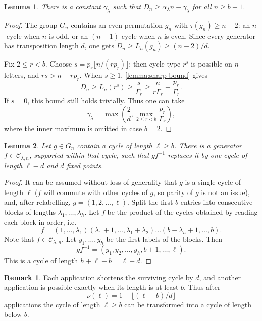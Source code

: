 \documentclass[DIV=12,10pt]{scrartcl}
\newtheorem{lemma}{Lemma}
\theoremstyle{definition}
\newtheorem{remark}{Remark}
\newcommand{\cc}{\mathcal{C}}
\begin{document}
\begin{lemma}
	\label{lemma:uniform-lower-certificate}
	There is a constant $\gamma_\lambda$ such that $D_n\geqslant \alpha_\lambda n -\gamma_\lambda$ for all $n\geqslant b+1$.
\end{lemma}
\begin{proof}
The group $G_n$ contains an even permutation $g_n$ with $\tau(g_n)\geqslant n-2$: an $n$-cycle when $n$ is odd, or an $(n-1)$-cycle when $n$ is even. Since every generator has transposition length $d$, one gets $D_n \geqslant L_n(g_n) \geqslant (n-2)/d$.

Fix $2\leqslant r<b$. Choose $s=p_r\lfloor n/(r p_r)\rfloor$; then cycle type $r^s$ is possible on $n$ letters, and $rs>n-r p_r$. When $s\geqslant 1$, \cref{lemma:sharp-bound} gives
\[
	D_n \geqslant L_n(r^s) \geqslant \frac{s}{\Gamma_r} \geqslant \frac{n}{r\Gamma_r} - \frac{p_r}{\Gamma_r}.
\]
If $s=0$, this bound still holds trivially. Thus one can take
\[
	\gamma_\lambda = \max\left( \frac{2}{d}, \max_{2\leqslant r < b} \frac{p_r}{\Gamma_r} \right),
\]
where the inner maximum is omitted in case $b=2$.
\end{proof}

\begin{lemma}
	\label{lemma:long-cycle-peeling}
	Let $g\in G_n$ contain a cycle of length $\ell \geqslant b$. There is a generator $f\in \cc_{\lambda,n}$, supported within that cycle, such that $gf^{-1}$ replaces it by one cycle of length $\ell-d$ and $d$ fixed points.
\end{lemma}
\begin{proof}
It can be assumed without loss of generality that $g$ is a single cycle of length $\ell$ ($f$ will commute with other cycles of $g$, so parity of $g$ is not an issue), and, after relabelling, $g=(1,2,\ldots,\ell)$. Split the first $b$ entries into consecutive blocks of lengths $\lambda_1,\ldots,\lambda_h$. Let $f$ be the product of the cycles obtained by reading each block in order, i.e.
\[
	f = (1,\ldots,\lambda_1)(\lambda_1+1,\ldots,\lambda_1+\lambda_2)\ldots(b-\lambda_h+1,\ldots,b).
\]
Note that $f\in \cc_{\lambda,n}$. Let $y_1,\ldots,y_h$ be the first labels of the blocks. Then
\[
	gf^{-1} = (y_1,y_2,\ldots,y_h,b+1,\ldots,\ell).
\]
This is a cycle of length $h+\ell-b = \ell-d$.
\end{proof}
\begin{remark}
	\label{rmk:consecutive-peeling}
	Each application shortens the surviving cycle by $d$, and another application is possible exactly when its length is at least $b$. Thus after
	\begin{equation}
		\label{eq:q-ell}
		\nu(\ell) = 1+\lfloor (\ell-b)/d \rfloor
	\end{equation}
	applications the cycle of length $\ell\geqslant b$ can be transformed into a cycle of length below $b$.
\end{remark}
\end{document}
